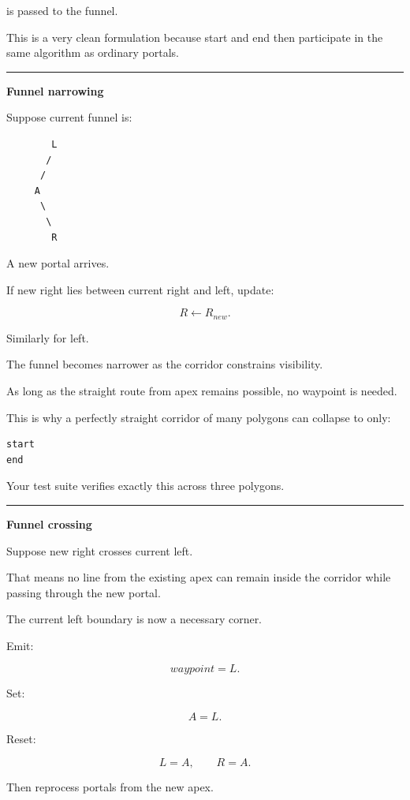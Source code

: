 is passed to the funnel.

This is a very clean formulation because start and end then participate in the same algorithm as ordinary portals.

\begin{center}\rule{0.5\linewidth}{0.5pt}\end{center}

\textbf{Funnel narrowing}

Suppose current funnel is:

\begin{verbatim}
        L
       /
      /
     A
      \
       \
        R
\end{verbatim}

A new portal arrives.

If new right lies between current right and left, update:

\[
R\leftarrow R_{new}.
\]

Similarly for left.

The funnel becomes narrower as the corridor constrains visibility.

As long as the straight route from apex remains possible, no waypoint is needed.

This is why a perfectly straight corridor of many polygons can collapse to only:

\begin{verbatim}
start
end
\end{verbatim}

Your test suite verifies exactly this across three polygons.

\begin{center}\rule{0.5\linewidth}{0.5pt}\end{center}

\textbf{Funnel crossing}

Suppose new right crosses current left.

That means no line from the existing apex can remain inside the corridor while passing through the new portal.

The current left boundary is now a necessary corner.

Emit:

\[
waypoint=L.
\]

Set:

\[
A=L.
\]

Reset:

\[
L=A,
\qquad
R=A.
\]

Then reprocess portals from the new apex.

